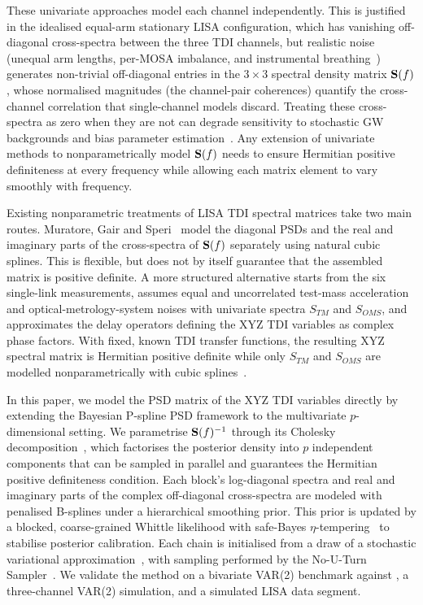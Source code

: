 \documentclass[%
	reprint,
	nofootinbib,
	amsmath,
	amssymb,
	aps,
]{revtex4-2}
\begin{document}
	These univariate approaches model each channel independently. This is
	justified in the idealised equal-arm stationary LISA configuration, which
	has vanishing off-diagonal cross-spectra between the three TDI channels,
	but realistic noise (unequal arm lengths, per-MOSA imbalance, and
	instrumental breathing~\citep{muratore2021instrumental}) generates
	non-trivial off-diagonal entries in the $3\times 3$ spectral density
	matrix $\S(f)$, whose normalised magnitudes (the channel-pair
	coherences) quantify the cross-channel correlation that
	single-channel models discard. Treating these cross-spectra as zero when they are not
	can degrade sensitivity to stochastic GW backgrounds and bias parameter
	estimation~\citep{PhysRevD.110.104060,PhysRevD.107.123531}.
	Any extension of univariate methods to nonparametrically model $\S(f)$
	needs to ensure Hermitian positive definiteness
	at every frequency while allowing each matrix element to vary smoothly
	with frequency.

    Existing nonparametric treatments of LISA TDI spectral matrices take two
    main routes. Muratore, Gair and Speri~\citep{PhysRevD.109.042001} model
    the diagonal PSDs and the real and imaginary parts of the cross-spectra of
    $\S(f)$ separately using natural cubic splines. This is flexible, but does
    not by itself guarantee that the assembled matrix is positive definite.
    A more structured alternative starts from the six single-link
    measurements, assumes equal and uncorrelated test-mass acceleration and
    optical-metrology-system noises with univariate spectra $S_{TM}$ and
    $S_{OMS}$, and approximates the delay operators defining the XYZ TDI
    variables as complex phase factors. With fixed, known TDI transfer
    functions, the resulting XYZ spectral matrix is Hermitian positive
    definite while only $S_{TM}$ and $S_{OMS}$ are modelled nonparametrically
    with cubic splines~\citep{BaghiQuentin2023Ugbf}.
    

	In this paper, we model the PSD matrix of the XYZ TDI variables directly by extending the Bayesian P-spline PSD framework
	\citep{maturana-russel_bayesian_2021} to the multivariate $p$-dimensional
	setting. We parametrise $\S(f)^{-1}$ through its Cholesky
	decomposition~\citep{RosenOri2007Aeom, Hu2023}, which factorises the
	posterior density into $p$ independent components that can be
	sampled in parallel and guarantees the Hermitian positive definiteness
	condition.
	Each block's log-diagonal spectra and real and imaginary parts of the complex
	off-diagonal cross-spectra are modeled with penalised B-splines under a
	hierarchical smoothing prior.
	This prior is updated by a blocked, coarse-grained Whittle likelihood
	with safe-Bayes $\eta$-tempering~\citep{grunwald2019} to stabilise
	posterior calibration. Each chain is initialised from a draw of a
	stochastic variational approximation~\citep{hoffman2013_SVI}, with
	sampling performed by the No-U-Turn Sampler~\citep{hoffman2014_NUTS}.
	We validate the method on a bivariate VAR(2) benchmark against
	\citet{Liu2023}, a three-channel VAR(2) simulation, and a simulated LISA
	data segment.
\end{document}
